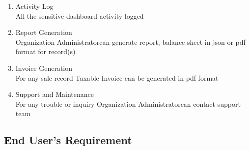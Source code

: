 \documentclass{report}
\def\admin{Organization Administrator}
\def\user{End User}
\begin{document}
\begin{enumerate}[start=1,label={\bfseries REQ \arabic*:}]
	\item Activity Log
		\\All the sensitive dashboard activity logged 
	\item Report Generation
		\\ \admin \space can generate report, balance-sheet in json or pdf format for record(s)
	\item Invoice Generation
		\\For any sale record Taxable Invoice can be generated in pdf format
	\item Support and Maintenance
		\\For any trouble or inquiry \admin \space can contact support team
	
\end{enumerate}
\subsection{\user's Requirement}
\end{document}

